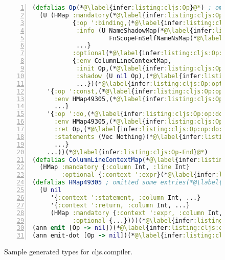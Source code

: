 \begin{figure}
\begin{lstlisting}[language=Clojure, numbers=left, numbersep=-8pt]
(defalias Op(*@\label{infer:listing:cljs:Op}@*) ; omitted some entries and 11 cases
  (U (HMap :mandatory(*@\label{infer:listing:cljs:Op:op:bindingStart}@*)
           {:op ':binding,(*@\label{infer:listing:cljs:Op:op:binding}@*)
            :info (U NameShadowMap(*@\label{infer:listing:cljs:Op:op:binding:NameShadowMap}@*)
                     FnScopeFnSelfNameNsMap(*@\label{infer:listing:cljs:Op:op:binding:FnScopeFnSelfNameNsMap}@*)),
            ...}
           :optional(*@\label{infer:listing:cljs:Op:optional}@*)
           {:env ColumnLineContextMap,
            :init Op,(*@\label{infer:listing:cljs:Op:optional:init:Op}@*)
            :shadow (U nil Op),(*@\label{infer:listing:cljs:Op:optional:shadow:Op}@*)
            ...})(*@\label{infer:listing:cljs:Op:optionalEnd}@*)(*@\label{infer:listing:cljs:Op:op:bindingEnd}@*)
    '{:op ':const,(*@\label{infer:listing:cljs:Op:op:const}@*)
      :env HMap49305,(*@\label{infer:listing:cljs:Op:op:const:HMap49305}@*)
      ...}
    '{:op ':do,(*@\label{infer:listing:cljs:Op:op:do}@*)
      :env HMap49305,(*@\label{infer:listing:cljs:Op:op:do:HMap49305}@*)
      :ret Op,(*@\label{infer:listing:cljs:Op:op:do:Op}@*)
      :statements (Vec Nothing)(*@\label{infer:listing:cljs:Op:op:do:statements}@*),
      ...}
    ...))(*@\label{infer:listing:cljs:Op-End}@*)
(defalias ColumnLineContextMap(*@\label{infer:listing:cljs:ColumnLineContextMap}@*)
  (HMap :mandatory {:column Int, :line Int}
        :optional {:context ':expr}(*@\label{infer:listing:cljs:ColumnLineContextMap:optional}@*)))(*@\label{infer:listing:cljs:ColumnLineContextMapEnd}@*)
(defalias HMap49305 ; omitted some extries(*@\label{infer:listing:cljs:HMap49305}@*)
  (U nil
     '{:context ':statement, :column Int, ...}
     '{:context ':return, :column Int, ...}
     (HMap :mandatory {:context ':expr, :column Int, ...}
           :optional {...})))(*@\label{infer:listing:cljs:HMap49305End}@*)
(ann emit [Op -> nil])(*@\label{infer:listing:cljs:emit}@*)
(ann emit-dot [Op -> nil])(*@\label{infer:listing:cljs:emit-dot}@*)
\end{lstlisting}
\caption{Sample generated types for cljs.compiler.
}
\label{infer:fig:cljs}

\end{figure}
